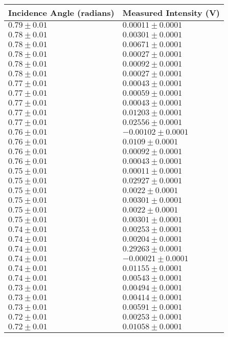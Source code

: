 \begin{tabular}{| p{} | p{} |}
\hline
Incidence Angle (radians) & Measured Intensity (V)\\
\hline
$0.79 \pm 0.01$ & $0.00011 \pm 0.0001$\\
$0.78 \pm 0.01$ & $0.00301 \pm 0.0001$\\
$0.78 \pm 0.01$ & $0.00671 \pm 0.0001$\\
$0.78 \pm 0.01$ & $0.00027 \pm 0.0001$\\
$0.78 \pm 0.01$ & $0.00092 \pm 0.0001$\\
$0.78 \pm 0.01$ & $0.00027 \pm 0.0001$\\
$0.77 \pm 0.01$ & $0.00043 \pm 0.0001$\\
$0.77 \pm 0.01$ & $0.00059 \pm 0.0001$\\
$0.77 \pm 0.01$ & $0.00043 \pm 0.0001$\\
$0.77 \pm 0.01$ & $0.01203 \pm 0.0001$\\
$0.77 \pm 0.01$ & $0.02556 \pm 0.0001$\\
$0.76 \pm 0.01$ & $-0.00102 \pm 0.0001$\\
$0.76 \pm 0.01$ & $0.0109 \pm 0.0001$\\
$0.76 \pm 0.01$ & $0.00092 \pm 0.0001$\\
$0.76 \pm 0.01$ & $0.00043 \pm 0.0001$\\
$0.75 \pm 0.01$ & $0.00011 \pm 0.0001$\\
$0.75 \pm 0.01$ & $0.02927 \pm 0.0001$\\
$0.75 \pm 0.01$ & $0.0022 \pm 0.0001$\\
$0.75 \pm 0.01$ & $0.00301 \pm 0.0001$\\
$0.75 \pm 0.01$ & $0.0022 \pm 0.0001$\\
$0.75 \pm 0.01$ & $0.00301 \pm 0.0001$\\
$0.74 \pm 0.01$ & $0.00253 \pm 0.0001$\\
$0.74 \pm 0.01$ & $0.00204 \pm 0.0001$\\
$0.74 \pm 0.01$ & $0.29263 \pm 0.0001$\\
$0.74 \pm 0.01$ & $-0.00021 \pm 0.0001$\\
$0.74 \pm 0.01$ & $0.01155 \pm 0.0001$\\
$0.74 \pm 0.01$ & $0.00543 \pm 0.0001$\\
$0.73 \pm 0.01$ & $0.00494 \pm 0.0001$\\
$0.73 \pm 0.01$ & $0.00414 \pm 0.0001$\\
$0.73 \pm 0.01$ & $0.00591 \pm 0.0001$\\
$0.72 \pm 0.01$ & $0.00253 \pm 0.0001$\\
$0.72 \pm 0.01$ & $0.01058 \pm 0.0001$\\
\hline
\end{tabular}\hfill
